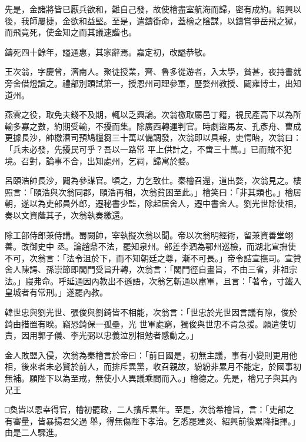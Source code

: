 \begin{pinyinscope}
 先是，金諸將皆已厭兵欲和，難自己發，故使檜盡室航海而歸，密有成約。紹興以後，我師屢捷，金欲和益堅。至是，遣鑄銜命，蓋檜之陰謀，以鑄嘗爭岳飛之獄，而飛竟死，使金知之而其議速諧也。



 鑄死四十餘年，謚通惠，其家辭焉。嘉定初，改謚恭敏。



 王次翁，字慶曾，濟南人。聚徒授業，齊、魯多從游者，入太學，貧甚，夜持書就旁舍借燈讀之。禮部別頭試第一，授恩州司理參軍，歷婺州教授、闢雍博士，出知道州。



 燕雲之役，取免夫錢不及期，輒以乏興論。次翁檄取屬邑丁籍，視民產高下以為所輸多寡之數，約期受輸，不擾而集。除廣西轉運判官。時劇盜馬友、孔彥舟、曹成更據長沙，帥檄漕司預鳩糧芻三十萬以備調發，次翁即以具報，吏愕眙，次翁曰：「兵未必發，先擾民可乎？吾以一路常
 平上供計之，不啻三十萬。」已而賊不犯境。召對，論事不合，出知處州，乞祠，歸寓於婺。



 呂頤浩帥長沙，闢為參謀官。頃之，力乞致仕。秦檜召還，道出婺，次翁見之。樓照言：「頤浩與次翁同郡，頤浩再相，次翁貧困至此。」檜笑曰：「非其類也。」檜居朝，遂以為吏部員外郎，遷秘書少監，除起居舍人，遷中書舍人。劉光世除使相，奏以文資蔭其子，次翁執奏繳還。



 除工部侍郎兼侍講。蜀闕帥，宰執擬次翁以聞。帝以次翁明經術，留兼資善堂翊善。改御史中
 丞。論趙鼎不法，罷知泉州。部差李泗為鄂州巡檢，而湖北宣撫使不可，次翁言：「法令沮於下，而不知朝廷之尊，漸不可長。」帝令詰宣撫司。宣贊舍人陳諤、孫崇節即閣門受旨升轉，次翁言：「閣門徑自畫旨，不由三省，非祖宗法。」寢弗命。呼延通因內教出不遜語，次翁乞斬通以肅軍，且言：「著令，寸鐵入皇城者有常刑。」遂罷內教。



 韓世忠與劉光世、張俊與劉錡皆不相能，次翁言：「世忠於光世因言議有隙，俊於錡由措置有睽。竊恐錡保一孤壘，光
 世軍處窮，獨俊與世忠不肯急援。願遣使切責，因用郭子儀、李光弼以忠義泣別相勉者感動之。」



 金人敗盟入侵，次翁為秦檜言於帝曰：「前日國是，初無主議，事有小變則更用他相，後來者未必賢於前人，而排斥異黨，收召親故，紛紛非累月不能定，於國事初無補。願陛下以為至戒，無使小人異議乘間而入。」檜德之。先是，檜兄子與其內兄王



 □奐皆以恩幸得官，檜初罷政，二人擯斥累年。至是，次翁希檜旨，言：「吏部之有審量，皆暴揚君父過
 舉，得無傷陛下孝治。乞悉罷建炎、紹興前後累降指揮。」由是二人驟進。




\end{pinyinscope}
